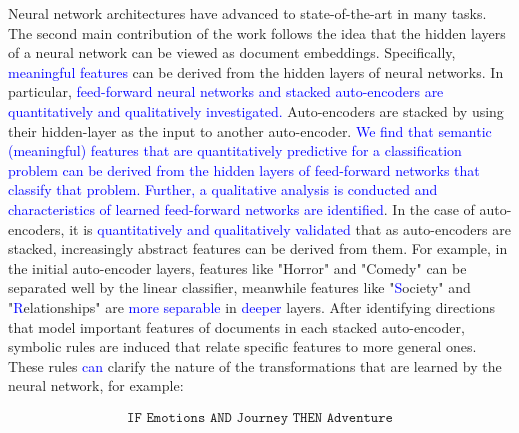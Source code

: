 \documentclass[a4paper,oneside,onecolumn,openright,12pt]{book}
\newcommand\hmark[1]{\textcolor{blue}{#1}}
\begin{document}
Neural network architectures have advanced to  state-of-the-art  in many tasks. The second main contribution of the work  follows the idea that the  hidden layers of a neural network can be viewed as document embeddings. Specifically, \hmark{meaningful features} can be  derived from the  hidden layers of neural networks. In particular, \hmark{ feed-forward neural networks and stacked auto-encoders are quantitatively and qualitatively investigated.} Auto-encoders are  stacked by using their hidden-layer as the input  to another auto-encoder. \hmark{We find that semantic (meaningful) features that are quantitatively predictive for   a  classification problem can be derived from the hidden layers of feed-forward networks that classify that problem. Further, a qualitative analysis is conducted and  characteristics of  learned feed-forward networks are identified}. In the case of auto-encoders, it is \hmark{quantitatively and qualitatively validated} that as  auto-encoders are  stacked, increasingly abstract features can be derived from them. For example, in the initial auto-encoder layers, features like "Horror" and "Comedy" can be separated well by the linear classifier, meanwhile  features like "\hmark{S}ociety" and "\hmark{R}elationships" are \hmark{more separable} in \hmark{deeper} layers. After identifying directions that model important features of documents in each stacked auto-encoder, symbolic rules are induced that relate specific features to more general ones. These rules \hmark{can} clarify the nature of the transformations that are learned by the neural network, for example:

\begin{align}\label{rule1}\texttt{IF Emotions  AND  Journey THEN Adventure}\end{align} 

\end{document}

